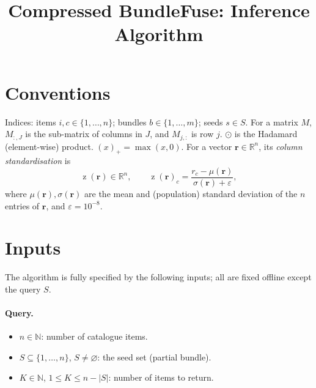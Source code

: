 \documentclass[11pt]{article}
\title{Compressed BundleFuse: Inference Algorithm}
\author{}
\date{}
\newcommand{\R}{\mathbb{R}}
\newcommand{\z}{\operatorname{z}}
\newcommand{\relu}[1]{(#1)_{+}}
\newcommand{\seeds}{S}
\begin{document}
\maketitle

\section{Conventions}

Indices: items $i,c \in \{1,\dots,n\}$; bundles $b \in \{1,\dots,m\}$; seeds $s \in \seeds$.
For a matrix $M$, $M_{:,J}$ is the sub-matrix of columns in $J$, and $M_{j,:}$ is row $j$.
$\odot$ is the Hadamard (element-wise) product. $\relu{x}=\max(x,0)$.
For a vector $\bm{r}\in\R^n$, its \emph{column standardisation} is
\[
  \z(\bm{r}) \in \R^n, \qquad \z(\bm{r})_c = \frac{r_c - \mu(\bm{r})}{\sigma(\bm{r}) + \varepsilon},
\]
where $\mu(\bm{r}),\sigma(\bm{r})$ are the mean and (population) standard deviation of the $n$ entries of
$\bm{r}$, and $\varepsilon = 10^{-8}$.

\section{Inputs}
The algorithm is fully specified by the following inputs; all are fixed offline except the query $\seeds$.

\paragraph{Query.}
\begin{itemize}\itemsep0pt
  \item $n \in \mathbb{N}$: number of catalogue items.
  \item $\seeds \subseteq \{1,\dots,n\}$, $\seeds \neq \varnothing$: the seed set (partial bundle).
  \item $K \in \mathbb{N}$, $1 \le K \le n-|\seeds|$: number of items to return.
\end{itemize}
\end{document}
